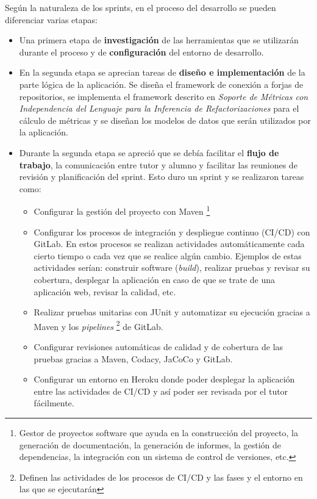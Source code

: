 Según la naturaleza de los sprints, en el proceso del desarrollo se pueden diferenciar varias etapas:
\begin{itemize}
	\item  Una primera etapa de \textbf{investigación} de las herramientas que se utilizarán durante el proceso y de \textbf{configuración} del entorno de desarrollo.
	\item En la segunda etapa se aprecian tareas de \textbf{diseño e implementación} de la parte lógica de la aplicación. Se diseña el framework de conexión a forjas de repositorios, se implementa el framework descrito en \textit{Soporte de Métricas con Independencia del Lenguaje para la Inferencia de Refactorizaciones}  \citep{marticorena_soporte_2005} para el cálculo de métricas y se diseñan los modelos de datos que serán utilizados por la aplicación.
	\item Durante la segunda etapa se apreció que se debía facilitar el \textbf{flujo de trabajo}, la comunicación entre tutor y alumno y facilitar las reuniones de revisión y planificación del sprint. Esto duro un sprint y se realizaron tareas como:
		\begin{itemize}
			\item Configurar la gestión del proyecto con Maven \footnote{Gestor de proyectos software que ayuda en la construcción del proyecto, la generación de documentación, la generación de informes, la gestión de dependencias, la integración con un sistema de control de versiones, etc.}
			\item Configurar los procesos de integración y despliegue continuo (CI/CD) con GitLab. En estos procesos se realizan actividades automáticamente cada cierto tiempo o cada vez que se realice algún cambio. Ejemplos de estas actividades serían: construir software (\textit{build}), realizar pruebas y revisar su cobertura, desplegar la aplicación en caso de que se trate de una aplicación web, revisar la calidad, etc.
			\item Realizar pruebas unitarias con JUnit y automatizar su ejecución gracias a Maven y los \textit{pipelines} \footnote{Definen las actividades de los procesos de CI/CD y las fases y el entorno en las que se ejecutarán} de GitLab.
			\item Configurar revisiones automáticas de calidad y de cobertura de las pruebas gracias a Maven, Codacy, JaCoCo y GitLab.
			\item Configurar un entorno en Heroku donde poder desplegar la aplicación entre las actividades de CI/CD y así poder ser revisada por el tutor fácilmente.

\end{itemize}
\end{itemize}
